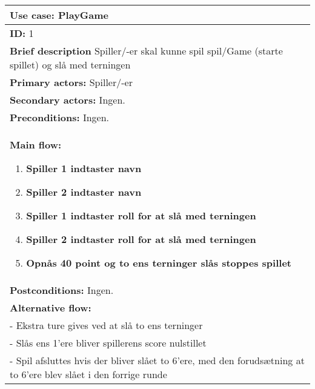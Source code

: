 \begin{center}
    \begin{tabular}{ | p{15cm} |}
    \hline
    \textbf{Use case:} PlayGame \\ \hline
    \textbf{ID:} 1 \\ \hline
    \textbf{Brief description} Spiller/-er skal kunne spil spil/Game (starte spillet) og slå med terningen     \\ \hline
    \textbf{Primary actors:} Spiller/-er \\ \hline
    \textbf{Secondary actors:} Ingen. \\ \hline
    \textbf{Preconditions:} Ingen.     \\ \hline
    \textbf{Main flow:}
    \begin{enumerate}
        \item \textbf{Spiller 1 indtaster navn}
        \item \textbf{Spiller 2 indtaster navn}
        \item \textbf{Spiller 1 indtaster roll for at slå med terningen}
        \item \textbf{Spiller 2 indtaster roll for at slå med terningen}
        \item \textbf{Opnås 40 point og to ens terninger slås stoppes spillet}    
    \end{enumerate} \\ \hline
    \textbf{Postconditions:} Ingen.\\ \hline
    \textbf{Alternative flow:}
    \\- Ekstra ture gives ved at slå to ens terninger
    \\- Slås ens 1’ere bliver spillerens score nulstillet
    \\- Spil afsluttes hvis der bliver slået to 6’ere, med den forudsætning at to 6’ere blev slået i den forrige runde  \\ \hline
    \hline
    \end{tabular}
\end{center}
